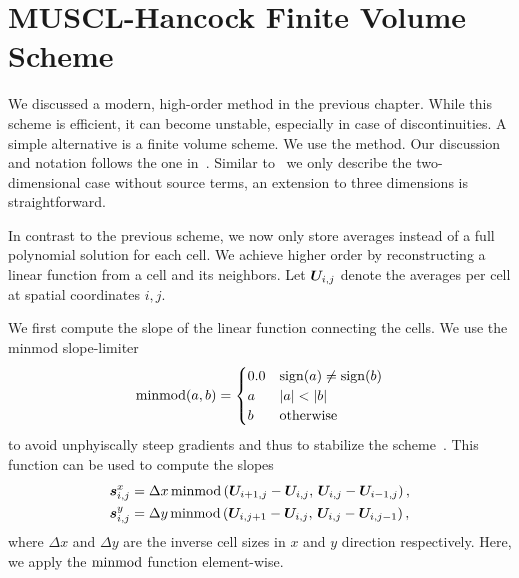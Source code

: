 \section{MUSCL-Hancock Finite Volume Scheme}\label{sec:muscl}
We discussed a modern, high-order \dg{} method in the previous chapter.
While this scheme is efficient, it can become unstable, especially in case of discontinuities.
A simple alternative is a finite volume scheme.
We use the \muscl{} method\cite{vanLeer1979towards}.
Our discussion and notation follows the one in~\cite{toro2009riemann}.
Similar to~\cite{toro2009riemann} we only describe the two-dimensional case without source terms, an extension to three dimensions is straightforward.

In contrast to the previous \dg{} scheme, we now only store averages instead of a full polynomial solution for each cell.
We achieve higher order by reconstructing a linear function from a cell and its neighbors.
Let $\cellAvg$ denote the averages per cell at spatial coordinates $i,j$.

We first compute the slope of the linear function connecting the cells.
We use the minmod slope-limiter
\begin{equation}
  \label{eq:minmod}
  \minmod(a, b) =
  \begin{cases}
    0.0 & \sign(a) \neq \sign(b) \\
      a & \vert a \vert < \vert b \vert \\
      b & \text{otherwise}
  \end{cases}
\end{equation}
to avoid unphyiscally steep gradients and thus to stabilize the scheme~\cite{leVeque2002finite}.
This function can be used to compute the slopes
\begin{align}\label{eq:slopes}
  \begin{split}
   \slope{x} &=  \Delta x \minmod \left( \cellAvg[i+1,j] - \cellAvg[i,j], \, \cellAvg[i,j] - \cellAvg[i-1, j] \right),\\ 
   \slope{y} &=  \Delta y \minmod \left( \cellAvg[i,j+1] - \cellAvg[i,j], \, \cellAvg[i,j] - \cellAvg[i, j-1] \right),
   \end{split}
\end{align}
where $\Delta x$ and $\Delta y$ are the inverse cell sizes in $x$ and $y$ direction respectively.
Here, we apply the $\minmod$ function element-wise.

